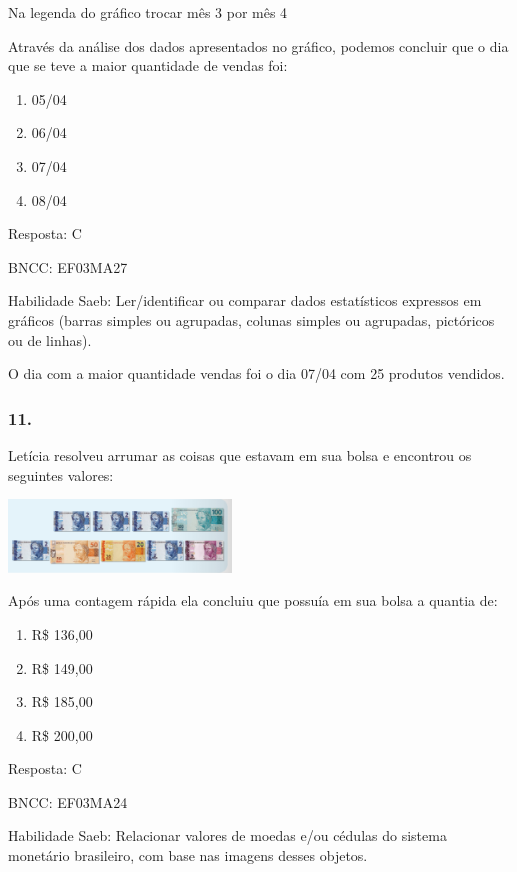 Na legenda do gráfico trocar mês 3 por mês 4

Através da análise dos dados apresentados no gráfico, podemos concluir
que o dia que se teve a maior quantidade de vendas foi:

\begin{enumerate}
\def\labelenumi{\alph{enumi})}
\item
  05/04
\item
  06/04
\item
  07/04
\item
  08/04
\end{enumerate}

Resposta: C

BNCC: EF03MA27

Habilidade Saeb: Ler/identificar ou comparar dados estatísticos
expressos em gráficos (barras simples ou agrupadas, colunas simples ou
agrupadas, pictóricos ou de linhas).

O dia com a maior quantidade vendas foi o dia 07/04 com 25 produtos
vendidos.

\subsubsection{11.}\label{section-166}

Letícia resolveu arrumar as coisas que estavam em sua bolsa e encontrou
os seguintes valores:

\includegraphics[width=2.33354in,height=0.76673in]{media/image125.png}

Após uma contagem rápida ela concluiu que possuía em sua bolsa a quantia
de:

\begin{enumerate}
\def\labelenumi{\alph{enumi})}
\item
  R\$ 136,00
\item
  R\$ 149,00
\item
  R\$ 185,00
\item
  R\$ 200,00
\end{enumerate}

Resposta: C

BNCC: EF03MA24

Habilidade Saeb: Relacionar valores de moedas e/ou cédulas do sistema
monetário brasileiro, com base nas imagens desses objetos.

